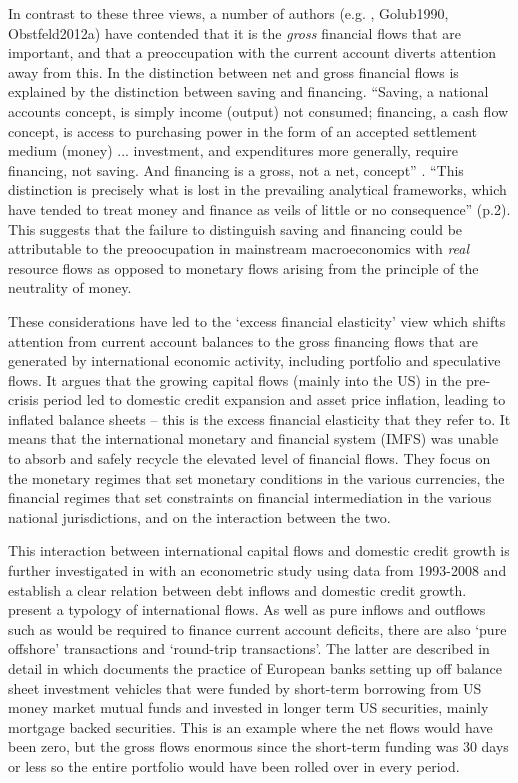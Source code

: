 \documentclass[twoside,a4paper,11pt]{article}
\begin{document}
In contrast to these three views, a number of authors (e.g.  \cite{Borio2011d}, Golub1990, Obstfeld2012a) have contended that it is the \emph{gross} financial flows that are important, and that a preoccupation with the current account diverts attention away from this. In \cite{Borio2015a} the distinction between net and gross financial flows is explained by the distinction between saving and financing. ``Saving, a national accounts concept, is simply income (output) not consumed; financing, a cash flow concept, is access to purchasing power in the form of an accepted settlement medium (money) ... investment, and expenditures more generally, require financing, not saving. And financing is a gross, not a net, concept'' \cite[p1-2]{Borio2015a}. ``This distinction is precisely what is lost in the prevailing analytical frameworks, which have tended to treat money and finance as veils of little or no consequence'' (p.2). This suggests that the failure to distinguish saving and financing could be attributable to the preoocupation in mainstream macroeconomics with \emph{real} resource flows as opposed to monetary flows arising from the principle of the neutrality of money.
 
These considerations have led to the `excess financial elasticity' view \cite{Borio2011d} which shifts attention  from current account balances to the gross financing flows that are generated by international economic activity, including portfolio and speculative flows. It argues that the growing capital flows (mainly into the US) in the pre-crisis period led to domestic credit expansion and asset price inflation, leading to inflated balance sheets  -- this is the excess financial elasticity that they refer to. It means that the international monetary and financial system (IMFS) was unable to absorb and safely recycle the elevated level of financial flows. They focus on the monetary regimes that set monetary conditions in the various currencies, the financial regimes that set constraints on financial intermediation in the various national jurisdictions, and on the interaction between the two.

This interaction between international capital flows and domestic credit growth is further investigated in \cite{Lane2014a} with an econometric study using data from 1993-2008 and establish a clear relation between debt inflows and domestic credit growth. \cite{Avdjiev2015} present a typology of international flows. As well as pure inflows and outflows such as would be required to finance current account deficits, there are also `pure offshore' transactions and `round-trip transactions'. The latter are described in detail in \cite{Acharya2010} which documents the practice of European banks setting up off balance sheet investment vehicles that were funded by short-term borrowing from US money market mutual funds and invested in longer term US securities, mainly mortgage backed securities. This is an example where the net flows would have been zero, but the gross flows enormous since the short-term funding was 30 days or less so the entire portfolio would have been rolled over in every period.
\end{document}
